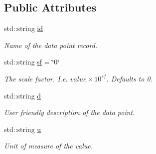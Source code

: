 \subsection*{Public Attributes}
\begin{DoxyCompactItemize}
\item 
\mbox{\label{structsunspec_1_1data_1_1_point_data_af650254f9eb6b59f4608e69a0470635a}} 
std\+::string \hyperlink{structsunspec_1_1data_1_1_point_data_af650254f9eb6b59f4608e69a0470635a}{id}
\begin{DoxyCompactList}\small\item\em Name of the data point record. \end{DoxyCompactList}\item 
\mbox{\label{structsunspec_1_1data_1_1_point_data_a57c2509e8cb97ee940315742a89288f0}} 
std\+::string \hyperlink{structsunspec_1_1data_1_1_point_data_a57c2509e8cb97ee940315742a89288f0}{sf} = \char`\"{}0\char`\"{}
\begin{DoxyCompactList}\small\item\em The scale factor. I.\+e. $ value \times 10^{sf} $. Defaults to 0. \end{DoxyCompactList}\item 
\mbox{\label{structsunspec_1_1data_1_1_point_data_a220678c7b1553f3c4331b817429164b0}} 
std\+::string \hyperlink{structsunspec_1_1data_1_1_point_data_a220678c7b1553f3c4331b817429164b0}{d}
\begin{DoxyCompactList}\small\item\em User friendly description of the data point. \end{DoxyCompactList}\item 
\mbox{\label{structsunspec_1_1data_1_1_point_data_acda6af95d18a8526f870df72e0abaa25}} 
std\+::string \hyperlink{structsunspec_1_1data_1_1_point_data_acda6af95d18a8526f870df72e0abaa25}{u}
\begin{DoxyCompactList}\small\item\em Unit of measure of the value. \end{DoxyCompactList}\item 
\mbox{\label{structsunspec_1_1data_1_1_point_data_a5c7544aa90af8105a9fe0571518f474a}} 

\end{DoxyCompactItemize}

